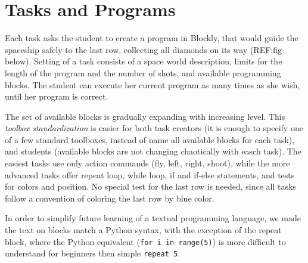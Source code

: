 



\section{Tasks and Programs}
\label{sec:robomission.programs}

Each task asks the student to create a program in Blockly,
that would guide the spaceship safely to the last row,
collecting all diamonds on its way (REF:fig-below).
Setting of a task consists of a space world description,
limits for the length of the program and the number of shots,
and available programming blocks. %
The student can execute her current program as many times
as she wish, until her program is correct.

The set of available blocks is gradually expanding with
increasing level. This \emph{toolbox standardization}
is easier for both task creators (it is enough to specify
one of a few standard toolboxes, instead of name all available blocks
for each task), and students (available blocks are not changing
chaotically with easch task).
The easiest tasks use only action commands (fly, left, right, shoot),
while the more advanced tasks offer repeat loop, while loop, if and if-else statements,
and tests for colors and position.
No special test for the last row is needed, since all tasks follow a convention
of coloring the last row by blue color.

In order to simplify future learning of a textual programming language,
we made the text on blocks match a Python syntax, %
with the exception of the repeat block, where the Python equivalent
(\texttt{for i in range(5)}) is more difficult to understand for beginners
then simple \texttt{repeat 5}.

